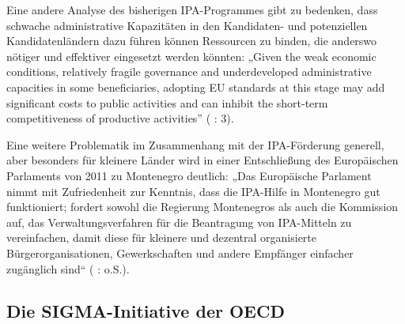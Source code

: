 Eine andere Analyse des bisherigen IPA-Programmes gibt zu bedenken, dass schwache administrative Kapazitäten in den Kandidaten- und potenziellen Kandidatenländern dazu führen können Ressourcen zu binden, die anderswo nötiger und effektiver eingesetzt werden könnten: „Given the weak economic conditions, relatively fragile governance and underdeveloped administrative capacities in some beneficiaries, adopting EU standards at this stage may add significant costs to public activities and can inhibit the short-term competitiveness of productive activities” (\cite{epec11} : 3).\par
Eine weitere Problematik im Zusammenhang mit der IPA-Förderung generell, aber besonders für kleinere Länder wird in einer Entschließung des Europäischen Parlaments von 2011 zu Montenegro deutlich: „Das Europäische Parlament nimmt mit Zufriedenheit zur Kenntnis, dass die IPA-Hilfe in Montenegro gut funktioniert; fordert sowohl die Regierung Montenegros als auch die Kommission auf, das Verwaltungsverfahren für die Beantragung von IPA-Mitteln zu vereinfachen, damit diese für kleinere und dezentral organisierte Bürgerorganisationen, Gewerkschaften und andere Empfänger einfacher zugänglich sind“ (\cite{eurpar11} : o.S.). 

\subsection{Die SIGMA-Initiative der OECD }
\label{subsec:Die SIGMA-Initiative der OECD}

